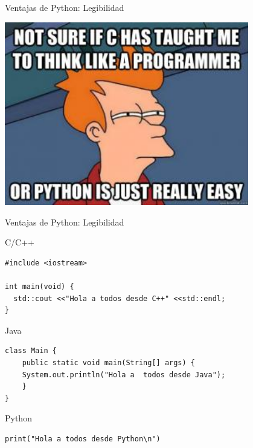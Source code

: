 \documentclass[bigger,unknownkeysallowed]{beamer}
\begin{document}
\begin{frame}[label={sec:org5270979}]{Ventajas de Python: Legibilidad}
\begin{center}
\includegraphics[width=0.8\textwidth]{easy.jpg}
\end{center}
\end{frame}


\begin{frame}[fragile,label={sec:org0a74128}]{Ventajas de Python: Legibilidad}
 \begin{block}{C/C++}
\begin{verbatim}
#include <iostream>

int main(void) {
  std::cout <<"Hola a todos desde C++" <<std::endl;
}
\end{verbatim}
\end{block}

\begin{block}{Java}
\begin{verbatim}
class Main {
    public static void main(String[] args) {
	System.out.println("Hola a  todos desde Java");
    }
}
\end{verbatim}
\end{block}

\begin{block}{Python}
\begin{verbatim}
print("Hola a todos desde Python\n")
\end{verbatim}
\end{block}
\end{frame}
\end{document}
